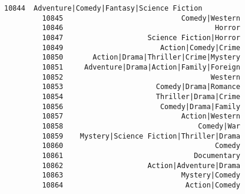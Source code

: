 \documentclass[11pt]{article}
\begin{document}
\begin{Verbatim}[commandchars=\\\{\}]
         10844  Adventure|Comedy|Fantasy|Science Fiction   
         10845                            Comedy|Western   
         10846                                    Horror   
         10847                    Science Fiction|Horror   
         10849                       Action|Comedy|Crime   
         10850       Action|Drama|Thriller|Crime|Mystery   
         10851     Adventure|Drama|Action|Family|Foreign   
         10852                                   Western   
         10853                      Comedy|Drama|Romance   
         10854                      Thriller|Drama|Crime   
         10856                       Comedy|Drama|Family   
         10857                            Action|Western   
         10858                                Comedy|War   
         10859    Mystery|Science Fiction|Thriller|Drama   
         10860                                    Comedy   
         10861                               Documentary   
         10862                    Action|Adventure|Drama   
         10863                            Mystery|Comedy   
         10864                             Action|Comedy   
         

\end{Verbatim}
\end{document}
